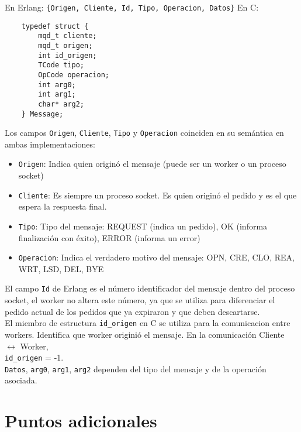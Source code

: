 \documentclass[a4paper, 11pt]{article}
\begin{document}
En Erlang:  \verb!{Origen, Cliente, Id, Tipo, Operacion, Datos}! 
\newpage
En C: \begin{verbatim} 
    typedef struct {
        mqd_t cliente;
        mqd_t origen;
        int id_origen;
        TCode tipo;
        OpCode operacion;
        int arg0;
        int arg1;
        char* arg2;
    } Message;
\end{verbatim}

Los campos \verb!Origen!, \verb!Cliente!, \verb!Tipo! y \verb!Operacion! coinciden en su semántica en ambas implementaciones:
\begin{itemize}

\item \verb!Origen!: Indica quien originó el mensaje (puede ser un worker o un proceso socket)
\item \verb!Cliente!: Es siempre un proceso socket. Es quien originó el pedido y es el que espera la respuesta final.
\item \verb!Tipo!: Tipo del mensaje: REQUEST (indica un pedido), OK (informa finalización con éxito), ERROR (informa un error)
\item \verb!Operacion!: Indica el verdadero motivo del mensaje: OPN, CRE, CLO, REA, WRT, LSD, DEL, BYE
\end{itemize}

El campo \verb!Id! de Erlang es el número identificador del mensaje dentro del proceso socket, el worker no altera este número, ya que se utiliza para diferenciar el pedido actual de los pedidos que ya expiraron y que deben descartarse.
\\

El miembro de estructura \verb!id_origen! en C se utiliza para la comunicacion entre workers. Identifica que worker originió el mensaje. En la comunicación Cliente $\leftrightarrow$ Worker,\\ \verb!id_origen! = -1.
\\

\verb!Datos!, \verb!arg0!, \verb!arg1!, \verb!arg2! dependen del tipo del mensaje y de la operación asociada.

\section*{Puntos adicionales}
\end{document}
